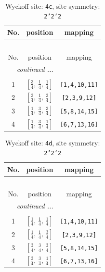 \documentclass[fleqn,8pt]{jsarticle}
\begin{document}
\renewcommand{\arraystretch}{1.2}
\begin{longtable}{ccc}
\caption{Wyckoff site: {\tt 4c}, site symmetry: {\tt 2'2'2}}
 \\
 \hline \hline
No. & position & mapping \\ \hline \endfirsthead

\multicolumn{2}{l}{\tablename\ \thetable{}} \\
 \hline \hline
No. & position & mapping \\ \hline \endhead

 \hline \hline
\multicolumn{2}{r}{\footnotesize\it continued ...} \\ \endfoot

 \hline \hline
\multicolumn{2}{r}{} \\ \endlastfoot

1 & $\left[ \frac{3}{4},\, \frac{1}{4},\, \frac{1}{4} \right]$ & {\tt [1,4,10,11]} \\ \hline
2 & $\left[ \frac{3}{4},\, \frac{1}{4},\, \frac{3}{4} \right]$ & {\tt [2,3,9,12]} \\ \hline
3 & $\left[ \frac{1}{4},\, \frac{3}{4},\, \frac{3}{4} \right]$ & {\tt [5,8,14,15]} \\ \hline
4 & $\left[ \frac{1}{4},\, \frac{3}{4},\, \frac{1}{4} \right]$ & {\tt [6,7,13,16]} \\
\end{longtable}
\renewcommand{\arraystretch}{1.2}
\begin{longtable}{ccc}
\caption{Wyckoff site: {\tt 4d}, site symmetry: {\tt 2'2'2}}
 \\
 \hline \hline
No. & position & mapping \\ \hline \endfirsthead

\multicolumn{2}{l}{\tablename\ \thetable{}} \\
 \hline \hline
No. & position & mapping \\ \hline \endhead

 \hline \hline
\multicolumn{2}{r}{\footnotesize\it continued ...} \\ \endfoot

 \hline \hline
\multicolumn{2}{r}{} \\ \endlastfoot

1 & $\left[ \frac{1}{4},\, \frac{1}{4},\, \frac{1}{4} \right]$ & {\tt [1,4,10,11]} \\ \hline
2 & $\left[ \frac{1}{4},\, \frac{1}{4},\, \frac{3}{4} \right]$ & {\tt [2,3,9,12]} \\ \hline
3 & $\left[ \frac{3}{4},\, \frac{3}{4},\, \frac{3}{4} \right]$ & {\tt [5,8,14,15]} \\ \hline
4 & $\left[ \frac{3}{4},\, \frac{3}{4},\, \frac{1}{4} \right]$ & {\tt [6,7,13,16]} \\
\end{longtable}
\end{document}
